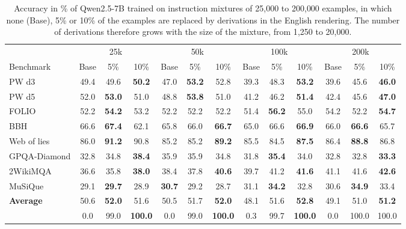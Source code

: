 \begin{table}[t]
\caption{Accuracy in \% of Qwen2.5-7B trained on instruction mixtures of 25{,}000 to 200{,}000 examples, in which none (Base), 5\% or 10\% of the examples are replaced by derivations in the English rendering. The number of derivations therefore grows with the size of the mixture, from 1{,}250 to 20{,}000.}
\label{tab:size}
\begin{center}
\footnotesize
\setlength{\tabcolsep}{3pt}
\begin{tabular}{lcccccccccccc}
\toprule
 & \multicolumn{3}{c}{25k} & \multicolumn{3}{c}{50k} & \multicolumn{3}{c}{100k} & \multicolumn{3}{c}{200k} \\
\cmidrule(lr){2-4}\cmidrule(lr){5-7}\cmidrule(lr){8-10}\cmidrule(lr){11-13}
Benchmark & Base & 5\% & 10\% & Base & 5\% & 10\% & Base & 5\% & 10\% & Base & 5\% & 10\% \\
\midrule
PW d3        & 49.4 & 49.6 & \textbf{50.2} & 47.0 & \textbf{53.2} & 52.8 & 39.3 & 48.3 & \textbf{53.2} & 39.6 & 45.6 & \textbf{46.0} \\
PW d5        & 52.0 & \textbf{53.0} & 51.0 & 48.8 & \textbf{53.8} & 51.0 & 41.2 & 46.2 & \textbf{51.4} & 42.4 & 45.6 & \textbf{47.0} \\
FOLIO        & 52.2 & \textbf{54.2} & 53.2 & 52.2 & 52.2 & 52.2 & 51.4 & \textbf{56.2} & 55.0 & 54.2 & 52.2 & \textbf{54.7} \\
BBH          & 66.6 & \textbf{67.4} & 62.1 & 65.8 & 66.0 & \textbf{66.7} & 65.0 & 66.6 & \textbf{66.9} & 66.0 & \textbf{66.6} & 65.7 \\
Web of lies  & 86.0 & \textbf{91.2} & 90.8 & 85.2 & 85.2 & \textbf{89.2} & 85.5 & 84.5 & \textbf{87.5} & 86.4 & \textbf{88.8} & 86.8 \\
GPQA-Diamond & 32.8 & 34.8 & \textbf{38.4} & 35.9 & 35.9 & 34.8 & 31.8 & \textbf{35.4} & 34.0 & 32.8 & 32.8 & \textbf{33.3} \\
2WikiMQA     & 36.6 & 35.8 & \textbf{38.0} & 38.4 & 37.8 & \textbf{40.6} & 39.7 & 41.2 & \textbf{41.6} & 41.1 & 41.6 & \textbf{42.6} \\
MuSiQue      & 29.1 & \textbf{29.7} & 28.9 & \textbf{30.7} & 29.2 & 28.7 & 31.1 & \textbf{34.2} & 32.8 & 30.6 & \textbf{34.9} & 33.4 \\
\midrule
\textbf{Average} & 50.6 & \textbf{52.0} & 51.6 & 50.5 & 51.7 & \textbf{52.0} & 48.1 & 51.6 & \textbf{52.8} & 49.1 & 51.0 & \textbf{51.2} \\
\midrule\midrule
\branchproof{} & 0.0 & 99.0 & \textbf{100.0} & 0.0 & 99.0 & \textbf{100.0} & 0.3 & 99.7 & \textbf{100.0} & 0.0 & 100.0 & 100.0 \\
\bottomrule
\end{tabular}
\end{center}
\vspace{-8pt}
\end{table}
